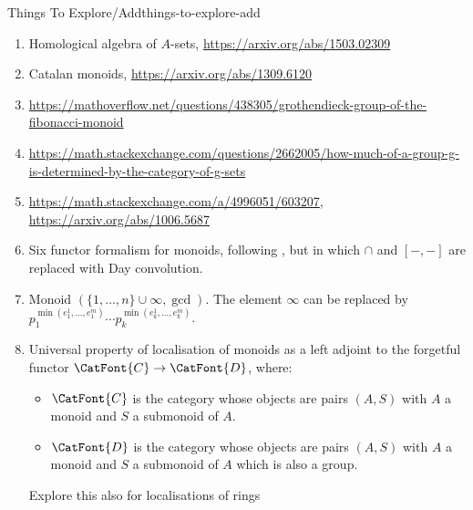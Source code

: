 \begin{remark}{Things To Explore/Add}{things-to-explore-add}
\begin{enumerate}
        \item Homological algebra of $A$-sets, \url{https://arxiv.org/abs/1503.02309}
        \item Catalan monoids, \url{https://arxiv.org/abs/1309.6120}
        \item \url{https://mathoverflow.net/questions/438305/grothendieck-group-of-the-fibonacci-monoid}
        \item \url{https://math.stackexchange.com/questions/2662005/how-much-of-a-group-g-is-determined-by-the-category-of-g-sets}
        \item \url{https://math.stackexchange.com/a/4996051/603207}, \url{https://arxiv.org/abs/1006.5687}
        \item Six functor formalism for monoids, following , but in which $\cap$ and $[-,-]$ are replaced with Day convolution.
        \item Monoid $(\{1,\ldots,n\}\cup\infty,\gcd)$. The element $\infty$ can be replaced by $p^{\min(e^{1}_{1},\ldots,e^{m}_{1})}_{1}\cdots p^{\min(e^{1}_{k},\ldots,e^{m}_{k})}_{k}$.
        \item Universal property of localisation of monoids as a left adjoint to the forgetful functor $\CatFont{C}\to\CatFont{D}$, where:
            \begin{itemize}
                \item $\CatFont{C}$ is the category whose objects are pairs $(A,S)$ with $A$ a monoid and $S$ a submonoid of $A$.
                \item $\CatFont{D}$ is the category whose objects are pairs $(A,S)$ with $A$ a monoid and $S$ a submonoid of $A$ which is also a group.
            \end{itemize}
            Explore this also for localisations of rings


\end{enumerate}
\end{remark}
